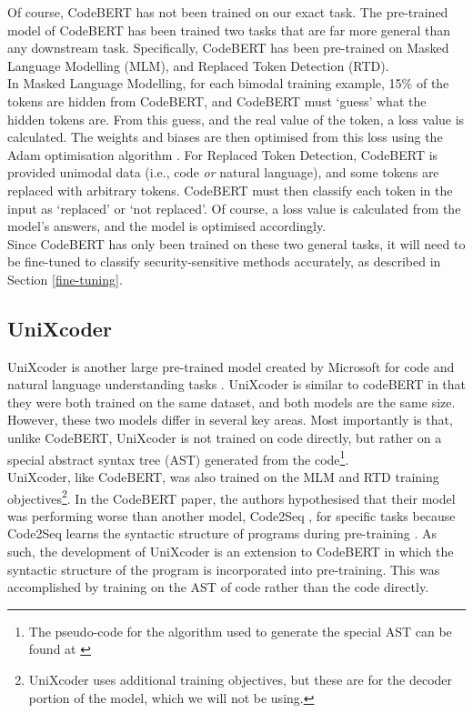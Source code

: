 \noindent
Of course, CodeBERT has not been trained on our exact task. The pre-trained model of CodeBERT has been trained two tasks that are far more general than any downstream task. Specifically, CodeBERT has been pre-trained on Masked Language Modelling (MLM), and Replaced Token Detection (RTD).\\

\noindent
In Masked Language Modelling, for each bimodal training example, 15\% of the tokens are hidden from CodeBERT, and CodeBERT must `guess' what the hidden tokens are. From this guess, and the real value of the token, a loss value is calculated. The weights and biases are then optimised from this loss using the Adam optimisation algorithm \cite{CodeBERT}. For Replaced Token Detection, CodeBERT is provided unimodal data (i.e., code \emph{or} natural language), and some tokens are replaced with arbitrary tokens. CodeBERT must then classify each token in the input as `replaced' or `not replaced'. Of course, a loss value is calculated from the model's answers, and the model is optimised accordingly. \\

\noindent
Since CodeBERT has only been trained on these two general tasks, it will need to be fine-tuned to classify security-sensitive methods accurately, as described in Section \ref{fine-tuning}.

\subsection{UniXcoder}
\noindent
UniXcoder is another large pre-trained model created by Microsoft for code and natural language understanding tasks \cite{unixcoder}. UniXcoder is similar to codeBERT in that they were both trained on the same dataset, and both models are the same size. However, these two models differ in several key areas. Most importantly is that, unlike CodeBERT, UniXcoder is not trained on code directly, but rather on a special abstract syntax tree (AST) generated from the code\footnote{The pseudo-code for the algorithm used to generate the special AST can be found at \cite[pg.~3]{unixcoder}}. \\

\noindent
UniXcoder, like CodeBERT, was also trained on the MLM and RTD training objectives\footnote{UniXcoder uses additional training objectives, but these are for the decoder portion of the model, which we will not be using.}. In the CodeBERT paper, the authors hypothesised that their model was performing worse than another model, Code2Seq \cite{code2seq}, for specific tasks because Code2Seq learns the syntactic structure of programs during pre-training \cite{CodeBERT}. As such, the development of UniXcoder is an extension to CodeBERT in which the syntactic structure of the program is incorporated into pre-training. This was accomplished by training on the AST of code rather than the code directly.

